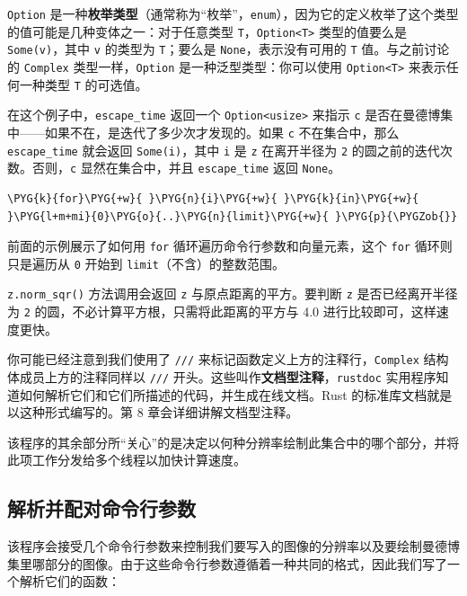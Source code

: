 \texttt{Option} 是一种\textbf{枚举类型}（通常称为“枚举”，\texttt{enum}），因为它的定义枚举了这个类型的值可能是几种变体之一：对于任意类型 \texttt{T}，\texttt{Option<T>} 类型的值要么是 \texttt{Some(v)}，其中 \texttt{v} 的类型为 \texttt{T}；要么是 \texttt{None}，表示没有可用的 \texttt{T} 值。与之前讨论的 \texttt{Complex} 类型一样，\texttt{Option} 是一种泛型类型：你可以使用 \texttt{Option<T>} 来表示任何一种类型 \texttt{T} 的可选值。

在这个例子中，\texttt{escape\_time} 返回一个 \texttt{Option<usize>} 来指示 \texttt{c} 是否在曼德博集中——如果不在，是迭代了多少次才发现的。如果 \texttt{c} 不在集合中，那么 \texttt{escape\_time} 就会返回 \texttt{Some(i)}，其中 \texttt{i} 是 \texttt{z} 在离开半径为 \texttt{2} 的圆之前的迭代次数。否则，\texttt{c} 显然在集合中，并且 \texttt{escape\_time} 返回 \texttt{None}。

\begin{Verbatim}[commandchars=\\\{\},breaklines=true,breakanywhere=true,fontsize=\codefont,xleftmargin=17bp]
\PYG{k}{for}\PYG{+w}{ }\PYG{n}{i}\PYG{+w}{ }\PYG{k}{in}\PYG{+w}{ }\PYG{l+m+mi}{0}\PYG{o}{..}\PYG{n}{limit}\PYG{+w}{ }\PYG{p}{\PYGZob{}}
\end{Verbatim}

前面的示例展示了如何用 \texttt{for} 循环遍历命令行参数和向量元素，这个 \texttt{for} 循环则只是遍历从 \texttt{0} 开始到 \texttt{limit}（不含）的整数范围。

\texttt{z.norm\_sqr()} 方法调用会返回 \texttt{z} 与原点距离的平方。要判断 \texttt{z} 是否已经离开半径为 \texttt{2} 的圆，不必计算平方根，只需将此距离的平方与 4.0 进行比较即可，这样速度更快。

你可能已经注意到我们使用了 \texttt{///} 来标记函数定义上方的注释行，\texttt{Complex} 结构体成员上方的注释同样以 \texttt{///} 开头。这些叫作\textbf{文档型注释}，\texttt{rustdoc} 实用程序知道如何解析它们和它们所描述的代码，并生成在线文档。Rust 的标准库文档就是以这种形式编写的。第 8 章会详细讲解文档型注释。

该程序的其余部分所“关心”的是决定以何种分辨率绘制此集合中的哪个部分，并将此项工作分发给多个线程以加快计算速度。

\subsection{解析并配对命令行参数}

该程序会接受几个命令行参数来控制我们要写入的图像的分辨率以及要绘制曼德博集里哪部分的图像。由于这些命令行参数遵循着一种共同的格式，因此我们写了一个解析它们的函数：

